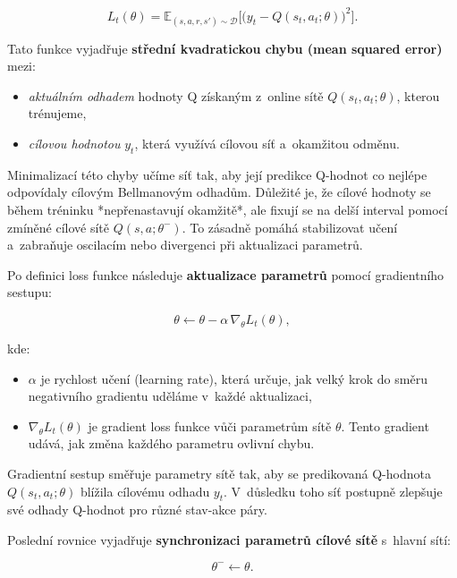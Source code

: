 \begin{equation}
L_t(\theta)=\mathbb{E}_{(s,a,r,s')\sim\mathcal{D}}\Big[\big(y_t-Q(s_t,a_t;\theta)\big)^2\Big].
\end{equation}

Tato funkce vyjadřuje \textbf{střední kvadratickou chybu (mean squared error)} mezi:
\begin{itemize}
    \item \textit{aktuálním odhadem} hodnoty Q získaným z~online sítě \(Q(s_t,a_t;\theta)\), kterou trénujeme,
    \item \textit{cílovou hodnotou} \(y_t\), která využívá cílovou síť a~okamžitou odměnu.
\end{itemize}

Minimalizací této chyby učíme síť tak, aby její predikce Q-hodnot co nejlépe odpovídaly cílovým Bellmanovým odhadům. Důležité je, že cílové hodnoty se během tréninku *nepřenastavují okamžitě*, ale fixují se na delší interval pomocí zmíněné cílové sítě \(Q(s,a;\theta^-)\). To zásadně pomáhá stabilizovat učení a~zabraňuje oscilacím nebo divergenci při aktualizaci parametrů.

Po definici loss funkce následuje \textbf{aktualizace parametrů} pomocí gradientního sestupu:

\begin{equation}
\theta\leftarrow\theta-\alpha\,\nabla_{\theta}L_t(\theta),
\end{equation}

kde:
\begin{itemize}
    \item \(\alpha\) je rychlost učení (learning rate), která určuje, jak velký krok do směru negativního gradientu uděláme v~každé aktualizaci,
    \item \(\nabla_{\theta}L_t(\theta)\) je gradient loss funkce vůči parametrům sítě \(\theta\). Tento gradient udává, jak změna každého parametru ovlivní chybu.
\end{itemize}

Gradientní sestup směřuje parametry sítě tak, aby se predikovaná Q-hodnota \(Q(s_t,a_t;\theta)\) blížila cílovému odhadu \(y_t\). V~důsledku toho síť postupně zlepšuje své odhady Q-hodnot pro různé stav-akce páry.

Poslední rovnice vyjadřuje \textbf{synchronizaci parametrů cílové sítě} s~hlavní sítí:

\begin{equation}
\theta^-\leftarrow\theta.
\end{equation}

